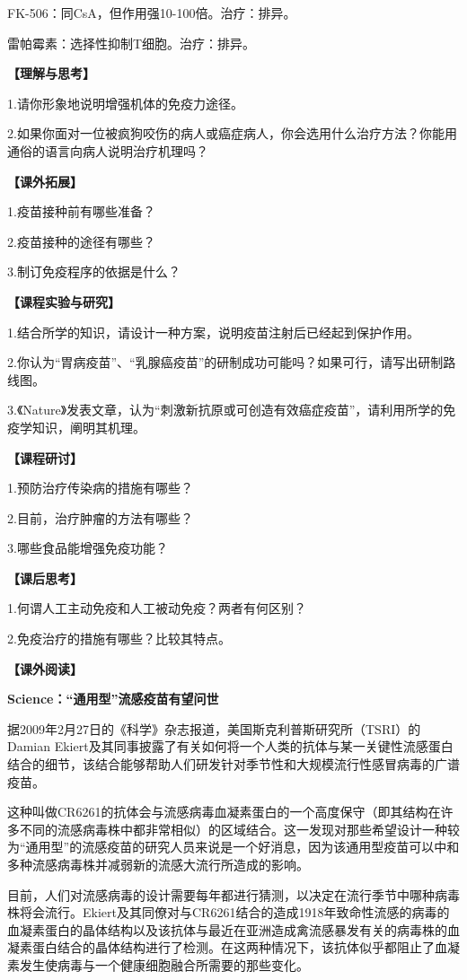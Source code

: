 FK-506：同CsA，但作用强10-100倍。治疗：排异。

雷帕霉素：选择性抑制T细胞。治疗：排异。

\noindent\textbf{【理解与思考】}

1.请你形象地说明增强机体的免疫力途径。

2.如果你面对一位被疯狗咬伤的病人或癌症病人，你会选用什么治疗方法？你能用通俗的语言向病人说明治疗机理吗？

\noindent\textbf{【课外拓展】}

1.疫苗接种前有哪些准备？

2.疫苗接种的途径有哪些？

3.制订免疫程序的依据是什么？

\noindent\textbf{【课程实验与研究】}

1.结合所学的知识，请设计一种方案，说明疫苗注射后已经起到保护作用。

2.你认为“胃病疫苗”、“乳腺癌疫苗”的研制成功可能吗？如果可行，请写出研制路线图。

3.《Nature》发表文章，认为“刺激新抗原或可创造有效癌症疫苗”，请利用所学的免疫学知识，阐明其机理。

\noindent\textbf{【课程研讨】}

1.预防治疗传染病的措施有哪些？

2.目前，治疗肿瘤的方法有哪些？

3.哪些食品能增强免疫功能？

\noindent\textbf{【课后思考】}

1.何谓人工主动免疫和人工被动免疫？两者有何区别？

2.免疫治疗的措施有哪些？比较其特点。

\noindent\textbf{【课外阅读】}

\begin{center}
 \textbf{\Large Science：“通用型”流感疫苗有望问世}
 \end{center}

据2009年2月27日的《科学》杂志报道，美国斯克利普斯研究所（TSRI）的Damian
Ekiert及其同事披露了有关如何将一个人类的抗体与某一关键性流感蛋白结合的细节，该结合能够帮助人们研发针对季节性和大规模流行性感冒病毒的广谱疫苗。

这种叫做CR6261的抗体会与流感病毒血凝素蛋白的一个高度保守（即其结构在许多不同的流感病毒株中都非常相似）的区域结合。这一发现对那些希望设计一种较为“通用型”的流感疫苗的研究人员来说是一个好消息，因为该通用型疫苗可以中和多种流感病毒株并减弱新的流感大流行所造成的影响。

目前，人们对流感病毒的设计需要每年都进行猜测，以决定在流行季节中哪种病毒株将会流行。Ekiert及其同僚对与CR6261结合的造成1918年致命性流感的病毒的血凝素蛋白的晶体结构以及该抗体与最近在亚洲造成禽流感暴发有关的病毒株的血凝素蛋白结合的晶体结构进行了检测。在这两种情况下，该抗体似乎都阻止了血凝素发生使病毒与一个健康细胞融合所需要的那些变化。

